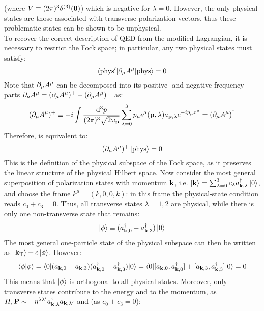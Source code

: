 (where $ V \equiv (2\pi)^3 \delta^{(3)}(\mathbf{0}) $) which is negative for $ \lambda = 0 $. However, the only physical states are those associated with transverse polarization vectors, thus these problematic states can be shown to be unphysical. \\
To recover the correct description of QED from the modified Lagrangian, it is necessary to restrict the Fock space; in particular, any two physical states must satisfy:
\begin{equation}
  \braket{\text{phys}' | \partial_\mu A^\mu | \text{phys}} = 0
  \label{eq:qed-phys-cond-1}
\end{equation}
Note that $ \partial_\mu A^\mu $ can be decomposed into its positive- and negative-frequency parts $ \partial_\mu A^\mu = (\partial_\mu A^\mu)^+ + (\partial_\mu A^\mu)^- $ as:
\begin{equation*}
  (\partial_\mu A^\mu)^+ \equiv -i \int \frac{\mathrm{d}^3p}{(2\pi)^3 \sqrt{2\omega_{\mathbf{p}}}} \sum_{\lambda = 0}^{3} p_\mu \epsilon^\mu(\mathbf{p},\lambda) a_{\mathbf{p},\lambda} e^{-i p_\mu x^\mu} = {(\partial_\mu A^\mu)}^\dagger
\end{equation*}
Therefore,  is equivalent to:
\begin{equation}
  (\partial_\mu A^\mu)^+ \ket{\text{phys}} = 0
\end{equation}
This is the definition of the physical subspace of the Fock space, as it preserves the linear structure of the physical Hilbert space. Now consider the most general superposition of polarization states with momentum $ \mathbf{k} $, i.e. $ \ket{\mathbf{k}} = \sum_{\lambda = 0}^{3} c_\lambda a_{\mathbf{k},\lambda}^\dagger \ket{0} $, and choose the frame $ k^\mu = (k,0,0,k) $: in this frame the physical-state condition reads $ c_0 + c_3 = 0 $. Thus, all transverse states $ \lambda = 1,2 $ are physical, while there is only one non-transverse state that remains:
\begin{equation*}
  \ket{\phi} \equiv (a_{\mathbf{k},0}^\dagger - a_{\mathbf{k},3}^\dagger) \ket{0}
\end{equation*}
The most general one-particle state of the physical subspace can then be written as $ \ket{\mathbf{k}_\text{T}} + c \ket{\phi} $. However:
\begin{equation*}
  \braket{\phi | \phi} = \braket{0 | (a_{\mathbf{k},0} - a_{\mathbf{k},3}) (a_{\mathbf{k},0}^\dagger - a_{\mathbf{k},3}^\dagger) | 0} = \braket{0 | [a_{\mathbf{k},0} , a_{\mathbf{k},0}^\dagger] + [a_{\mathbf{k},3} , a_{\mathbf{k},3}^\dagger] | 0} = 0
\end{equation*}
This means that $ \ket{\phi} $ is orthogonal to all physical states. Moreover, only transverse states contribute to the energy and to the momentum, as $ H , \mathbf{P} \sim - \eta^{\lambda \lambda'} a_{\mathbf{k},\lambda}^\dagger a_{\mathbf{k},\lambda'} $ and (as $ c_0 + c_3 = 0 $):
